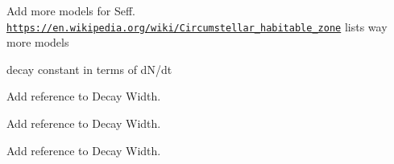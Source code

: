 
\begin{DoxyRefList}
\item[\label{todo__todo000001}%
\Hypertarget{todo__todo000001}%
File \hyperlink{_circumstellar_habitable_zone_8hpp}{Circumstellar\+Habitable\+Zone.hpp} ]Add more models for Seff. \href{https://en.wikipedia.org/wiki/Circumstellar_habitable_zone}{\tt https\+://en.\+wikipedia.\+org/wiki/\+Circumstellar\+\_\+habitable\+\_\+zone} lists way more models  
\item[\label{todo__todo000002}%
\Hypertarget{todo__todo000002}%
File \hyperlink{_decay_constant_8hpp}{Decay\+Constant.hpp} ]decay constant in terms of d\+N/dt  
\item[\label{todo__todo000003}%
\Hypertarget{todo__todo000003}%
File \hyperlink{_half_life_8hpp}{Half\+Life.hpp} ]Add reference to Decay Width.  
\item[\label{todo__todo000004}%
\Hypertarget{todo__todo000004}%
File \hyperlink{_nuclear_binding_energy_8hpp}{Nuclear\+Binding\+Energy.hpp} ]Add reference to Decay Width.  
\item[\label{todo__todo000005}%
\Hypertarget{todo__todo000005}%
File \hyperlink{_semi_empirical_mass_formula_8hpp}{Semi\+Empirical\+Mass\+Formula.hpp} ]Add reference to Decay Width. 
\end{DoxyRefList}